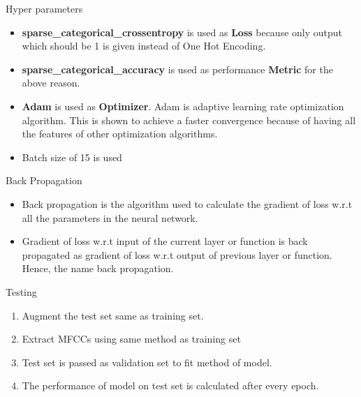 \documentclass[11pt]{beamer}
\begin{document}
\begin{frame}
{Hyper parameters}
\begin{itemize}
    \item \textbf{sparse\_categorical\_crossentropy} is used as \textbf{Loss} because only output which should be 1 is given instead of One Hot Encoding.
    \item \textbf{sparse\_categorical\_accuracy} is used as performance \textbf{Metric} for the above reason.
    \item \textbf{Adam} is used as \textbf{Optimizer}. Adam is adaptive learning rate optimization algorithm. This is shown to achieve a faster convergence because of having all the features of other optimization algorithms.
    \item Batch size of 15 is used
\end{itemize}
\end{frame}

\begin{frame}
{ Back Propagation}
\begin{itemize}
\item Back propagation is the algorithm used to calculate
the gradient of loss w.r.t all the parameters in the
neural network. 
\item Gradient of loss w.r.t input of the current layer or
function is back propagated as gradient of loss w.r.t
output of previous layer or function. Hence, the
name back propagation.
\end{itemize}
\end{frame}

\begin{frame}
{Testing}
\begin{enumerate}
    \item Augment the test set same as training set.
    \item Extract MFCCs using same method as training set
    \item Test set is passed as validation set to fit method of model.
    \item The performance of model on test set is calculated after every epoch.
\end{enumerate}

\end{frame}
\end{document}
